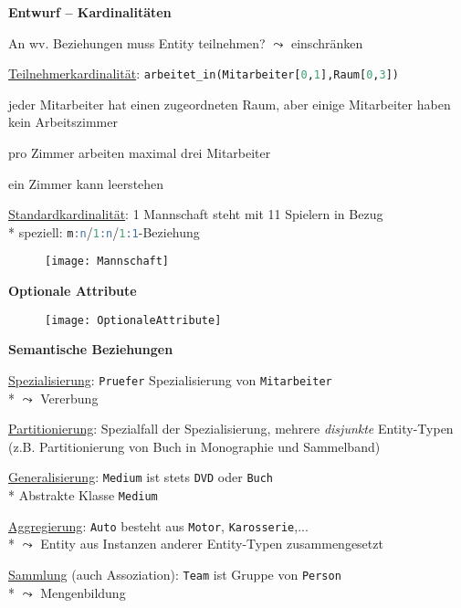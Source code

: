 \textbf{Entwurf -- Kardinalitäten}
\begin{items}
	\item An wv. Beziehungen muss Entity teilnehmen? \( \leadsto \) einschränken
	\item \underline{Teilnehmerkardinalität}: \lstinline[language=sql]{arbeitet_in(Mitarbeiter[0,1],Raum[0,3])}
	\begin{enumeration}
	 	\item jeder Mitarbeiter hat einen zugeordneten Raum, aber einige Mitarbeiter haben kein Arbeitszimmer
	 	\item pro Zimmer arbeiten maximal drei Mitarbeiter
	 	\item ein Zimmer kann leerstehen
	 \end{enumeration} 
	 \item \underline{Standardkardinalität}: 1 Mannschaft steht mit 11 Spielern in Bezug \\* speziell: \lstinline[language=sql]{m:n}/\lstinline[language=sql]{1:n}/\lstinline[language=sql]{1:1}-Beziehung
	 \begin{figure}[H]\centering\label{Mannschaft}\texttt{[image: Mannschaft]}\end{figure}
\end{items}

\textbf{Optionale Attribute}
\begin{figure}[H]\centering\label{OptionaleAttribute}\texttt{[image: OptionaleAttribute]}\end{figure}

\newpage

\textbf{Semantische Beziehungen}
\begin{items}
	\item \underline{Spezialisierung}: \lstinline[language=sql]{Pruefer} Spezialisierung von \lstinline[language=sql]{Mitarbeiter} \\* \( \leadsto \) Vererbung
	\item \underline{Partitionierung}: Spezialfall der Spezialisierung, mehrere \emph{disjunkte} Entity-Typen (z.B. Partitionierung von Buch in Monographie und Sammelband)
	\item \underline{Generalisierung}: \lstinline[language=sql]{Medium} ist stets \lstinline[language=sql]{DVD} oder \lstinline[language=sql]{Buch} \\* Abstrakte Klasse \lstinline[language=sql]{Medium}
	\item \underline{Aggregierung}: \lstinline[language=sql]{Auto} besteht aus \lstinline[language=sql]{Motor}, \lstinline[language=sql]{Karosserie},... \\* \( \leadsto \) Entity aus Instanzen anderer Entity-Typen zusammengesetzt
	\item \underline{Sammlung} (auch Assoziation): \lstinline[language=sql]{Team} ist Gruppe von \lstinline[language=sql]{Person} \\* \( \leadsto \) Mengenbildung
\end{items}

